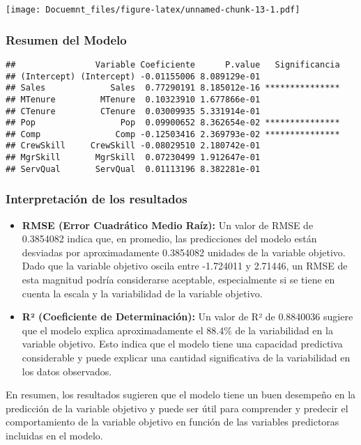 \documentclass[
]{article}
\begin{document}
\texttt{[image: Docuemnt\_files/figure-latex/unnamed-chunk-13-1.pdf]}

\hypertarget{resumen-del-modelo}{%
\subsubsection{Resumen del Modelo}\label{resumen-del-modelo}}

\begin{verbatim}
##                Variable Coeficiente      P.value   Significancia
## (Intercept) (Intercept) -0.01155006 8.089129e-01                
## Sales             Sales  0.77290191 8.185012e-16 ***************
## MTenure         MTenure  0.10323910 1.677866e-01                
## CTenure         CTenure  0.03009935 5.331914e-01                
## Pop                 Pop  0.09900652 8.362654e-02 ***************
## Comp               Comp -0.12503416 2.369793e-02 ***************
## CrewSkill     CrewSkill -0.08029510 2.180742e-01                
## MgrSkill       MgrSkill  0.07230499 1.912647e-01                
## ServQual       ServQual  0.01113196 8.382281e-01
\end{verbatim}

\hypertarget{interpretaciuxf3n-de-los-resultados}{%
\subsubsection{Interpretación de los
resultados}\label{interpretaciuxf3n-de-los-resultados}}

\begin{itemize}
\item
  \textbf{RMSE (Error Cuadrático Medio Raíz):} Un valor de RMSE de
  0.3854082 indica que, en promedio, las predicciones del modelo están
  desviadas por aproximadamente 0.3854082 unidades de la variable
  objetivo. Dado que la variable objetivo oscila entre -1.724011 y
  2.71446, un RMSE de esta magnitud podría considerarse aceptable,
  especialmente si se tiene en cuenta la escala y la variabilidad de la
  variable objetivo.
\item
  \textbf{R² (Coeficiente de Determinación):} Un valor de R² de
  0.8840036 sugiere que el modelo explica aproximadamente el 88.4\% de
  la variabilidad en la variable objetivo. Esto indica que el modelo
  tiene una capacidad predictiva considerable y puede explicar una
  cantidad significativa de la variabilidad en los datos observados.
\end{itemize}

En resumen, los resultados sugieren que el modelo tiene un buen
desempeño en la predicción de la variable objetivo y puede ser útil para
comprender y predecir el comportamiento de la variable objetivo en
función de las variables predictoras incluidas en el modelo.
\end{document}
